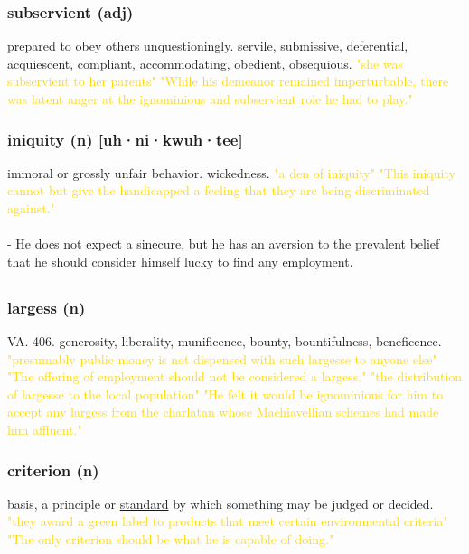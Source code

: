 \documentclass{proc}
\begin{document}
	\subsubsection{\textcolor{brickred}{subservient} (adj)}
	prepared to obey others unquestioningly. servile, submissive,
	deferential,
	acquiescent,
	compliant,
	accommodating,
	obedient, obsequious.
	\textcolor{gold}{"she was subservient to her parents" "While his demeanor remained imperturbable, there was latent anger at the ignominious and subservient role he had to play."}
	
	\subsubsection{\textcolor{brickred}{iniquity} (n) [uh·ni·kwuh·tee]}
	immoral or grossly unfair behavior. wickedness.
	\textcolor{gold}{"a den of iniquity" "This iniquity cannot but give the handicapped a feeling that they are being discriminated against."}\\\\
	- He does not expect a sinecure, but he has an aversion to the prevalent belief that he should consider himself lucky to find any employment. 
	
	\newpage
	\subsection{}
	\subsubsection{\textcolor{brickred}{largess} (n)}
	VA. 406. generosity,
	liberality,
	munificence,
	bounty,
	bountifulness,
	beneficence.
	\textcolor{gold}{"presumably public money is not dispensed with such largesse to anyone else" "The offering of employment should not be considered a largess." "the distribution of largesse to the local population" "He felt it would be ignominious for him to accept any largess from the charlatan whose Machiavellian schemes had made him affluent."}
	
	\subsubsection{\textcolor{brickred}{criterion} (n)}
	basis, a principle or \underline{standard} by which something may be judged or decided.
	\textcolor{gold}{"they award a green label to products that meet certain environmental criteria" "The only criterion should be what he is capable of doing."}
	
\end{document}
